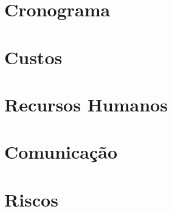 \section{Cronograma}

\section{Custos}

\section{Recursos Humanos}

\section{Comunicação}

\section{Riscos}